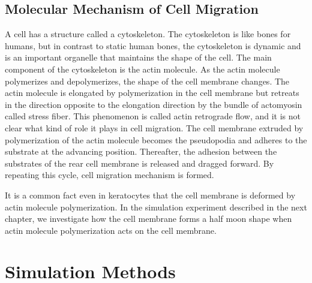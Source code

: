 \documentclass[a4paper,12pt]{book}
\begin{document}
\section{Molecular Mechanism of Cell Migration}
A cell has a structure called a cytoskeleton. The cytoskeleton is like bones for humans, but in contrast to static human bones, the cytoskeleton is dynamic and is an important organelle that maintains the shape of the cell. The main component of the cytoskeleton is the actin molecule. As the actin molecule polymerizes and depolymerizes, the shape of the cell membrane changes. The actin molecule is elongated by polymerization in the cell membrane but retreats in the direction opposite to the elongation direction by the bundle of actomyosin called stress fiber. This phenomenon is called actin retrograde flow, and it is not clear what kind of role it plays in cell migration. The cell membrane extruded by polymerization of the actin molecule becomes the pseudopodia and adheres to the substrate at the advancing position. Thereafter, the adhesion between the substrates of the rear cell membrane is released and dragged forward. By repeating this cycle, cell migration mechanism is formed.

It is a common fact even in keratocytes that the cell membrane is deformed by actin molecule polymerization. In the simulation experiment described in the next chapter, we investigate how the cell membrane forms a half moon shape when actin molecule polymerization acts on the cell membrane.


\chapter{Simulation Methods}
\end{document}

